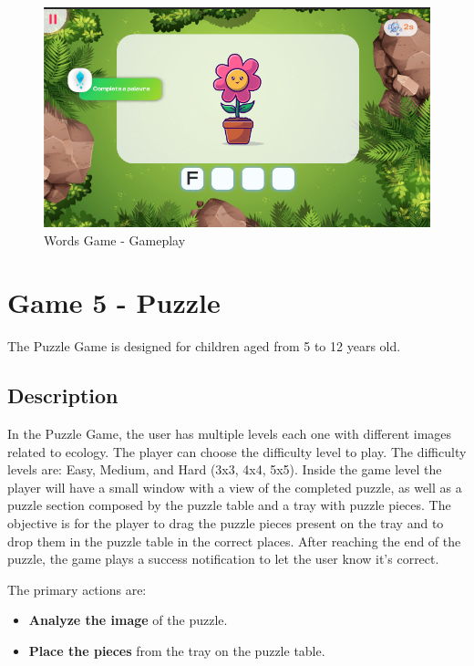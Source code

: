 \begin{figure}[H]
    \centering
    \includegraphics[width=0.9\linewidth]{Chapters/gameplay/WordsGame.jpg}
    \caption{Words Game - Gameplay}
    \label{fig:wordsGameplay}    
\end{figure}

\section{Game 5 - Puzzle}
\label{c3Puzzle}

The Puzzle Game is designed for children aged from 5 to 12 years old.

\subsection*{Description}

In the Puzzle Game, the user has multiple levels each one with different images related to ecology. The player can choose the difficulty level to play. The difficulty levels are: Easy, Medium, and Hard (3x3, 4x4, 5x5). Inside the game level the player will have a small window with a view of the completed puzzle, as well as a puzzle section composed by the puzzle table and a tray with puzzle pieces.
The objective is for the player to drag the puzzle pieces present on the tray and to drop them in the puzzle table in the correct places. After reaching the end of the puzzle, the game plays a success notification to let the user know it's correct.

The primary actions are:

\begin{itemize}
    \item \textbf{Analyze the image} of the puzzle.
    \item \textbf{Place the pieces} from the tray on the puzzle table.
\end{itemize}

